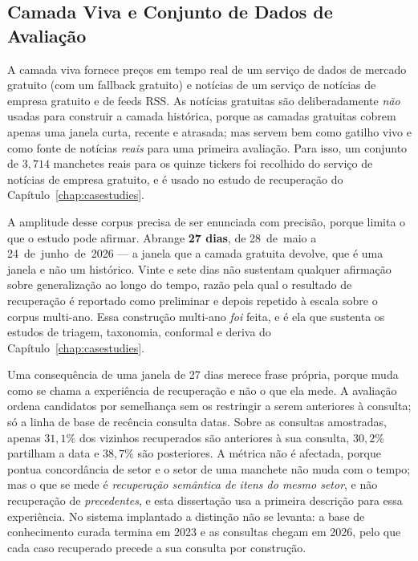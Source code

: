 \subsection{Camada Viva e Conjunto de Dados de Avaliação}
\label{sec:met_data_live}

A camada viva fornece preços em tempo real de um serviço de dados de mercado gratuito (com um fallback
gratuito) e notícias de um serviço de notícias de empresa gratuito e de feeds RSS. As notícias gratuitas são
deliberadamente \emph{não} usadas para construir a camada histórica, porque as camadas gratuitas cobrem
apenas uma janela curta, recente e atrasada; mas servem bem como gatilho vivo e como fonte de notícias
\emph{reais} para uma primeira avaliação. Para isso, um conjunto de $3{,}714$ manchetes reais para os
quinze tickers foi recolhido do serviço de notícias de empresa gratuito, e é usado no estudo de
recuperação do Capítulo~\ref{chap:casestudies}.

A amplitude desse corpus precisa de ser enunciada com precisão, porque limita o que o estudo pode
afirmar. Abrange \textbf{27 dias}, de 28~de~maio a 24~de~junho~de~2026 --- a janela que a camada
gratuita devolve, que é uma janela e não um histórico. Vinte e sete dias não sustentam qualquer
afirmação sobre generalização ao longo do tempo, razão pela qual o resultado de recuperação é reportado
como preliminar e depois repetido à escala sobre o corpus multi-ano. Essa construção multi-ano
\emph{foi} feita, e é ela que sustenta os estudos de triagem, taxonomia, conformal e deriva do
Capítulo~\ref{chap:casestudies}.

Uma consequência de uma janela de 27 dias merece frase própria, porque muda como se chama a experiência
de recuperação e não o que ela mede. A avaliação ordena candidatos por semelhança sem os restringir a
serem anteriores à consulta; só a linha de base de recência consulta datas. Sobre as consultas
amostradas, apenas $31,1\%$ dos vizinhos recuperados são anteriores à sua consulta, $30,2\%$ partilham a
data e $38,7\%$ são posteriores. A métrica não é afectada, porque pontua concordância de setor e o setor
de uma manchete não muda com o tempo; mas o que se mede é \emph{recuperação semântica de itens do mesmo
setor}, e não recuperação de \emph{precedentes}, e esta dissertação usa a primeira descrição para essa
experiência. No sistema implantado a distinção não se levanta: a base de conhecimento curada termina em
2023 e as consultas chegam em 2026, pelo que cada caso recuperado precede a sua consulta por construção.

